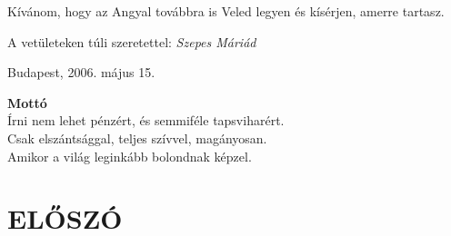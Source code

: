 Kívánom, hogy az Angyal továbbra is Veled legyen és kísérjen,
amerre tartasz.

\bigskip\bigskip
A vetületeken túli szeretettel: \hfill \textit{Szepes Máriád}

\bigskip\bigskip\noindent
Budapest, 2006. május 15.

\clearpage

\begin{flushright}
\textbf{Mottó}						\\
Írni nem lehet pénzért, és semmiféle tapsviharért.	\\
Csak elszántsággal, teljes szívvel, magányosan.		\\
Amikor a világ leginkább bolondnak képzel.
\end{flushright}

\chapter{ELŐSZÓ}


